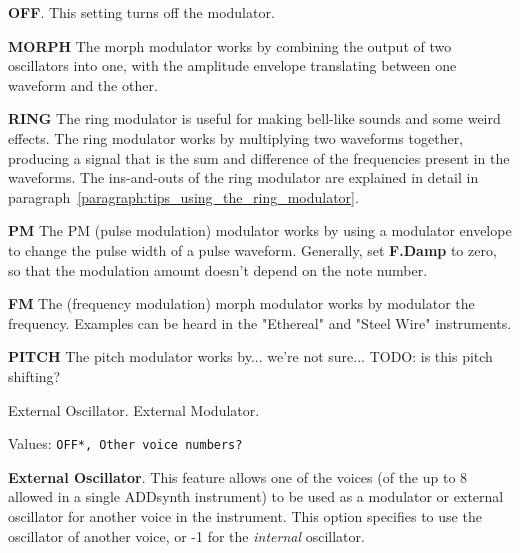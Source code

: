    \begin{enumber}
      \item \textbf{OFF}.
         This setting turns off the modulator.
      \item \textbf{MORPH}
         The morph modulator works by combining the output of two oscillators
         into one, with the amplitude envelope translating between one waveform
         and the other.
      \item \textbf{RING}
         The ring modulator is useful for making bell-like sounds and some
         weird effects.  The ring modulator works by multiplying two
         waveforms together, producing a signal that is the sum and
         difference of the frequencies present in the waveforms.  The
         ins-and-outs of the ring modulator are explained in detail in
         paragraph~\ref{paragraph:tips_using_the_ring_modulator}.
      \item \textbf{PM}
         The PM (pulse modulation) modulator works by using a modulator
         envelope to change the pulse width of a pulse waveform.
         Generally, set \textbf{F.Damp} to zero, so that the modulation amount
         doesn't depend on the note number.
      \item \textbf{FM}
         The (frequency modulation) morph modulator works by modulator the
         frequency.  Examples can be heard in the "Ethereal" and "Steel Wire"
         instruments.
      \item \textbf{PITCH}
         The pitch modulator works by...
         we're not sure... TODO: is this pitch shifting?
   \end{enumber}

   External Oscillator.
   External Modulator.

   Values: \texttt{OFF*, Other voice numbers?}

   \textbf{External Oscillator}.
   This feature allows one of the voices (of the up to 8 allowed in a single
   ADDsynth instrument) to be used as a modulator or external oscillator for
   another voice in the instrument.
   This option specifies to use the oscillator of another voice, or
   -1 for the \textsl{internal} oscillator.

